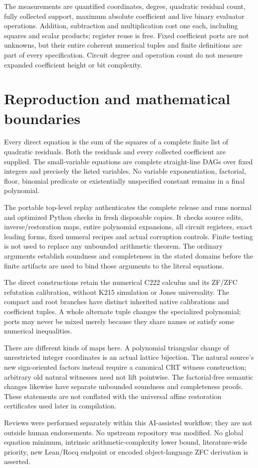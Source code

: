 \documentclass[11pt]{article}
\theoremstyle{definition}\newtheorem{definition}[theorem]{Definition}
\theoremstyle{remark}\newtheorem{remark}[theorem]{Remark}
\begin{document}
The measurements are quantified coordinates, degree, quadratic residual
count, fully collected support, maximum absolute coefficient and live
binary evaluator operations. Addition, subtraction and multiplication
cost one each, including squares and scalar products; register reuse is
free. Fixed coefficient ports are not unknowns, but their entire coherent
numerical tuples and finite definitions are part of every specification.
Circuit degree and operation count do not measure expanded coefficient
height or bit complexity.






\section{Reproduction and mathematical boundaries}
Every direct equation is the sum of the squares of a complete finite list
of quadratic residuals. Both the residuals and every collected coefficient
are supplied. The small-variable equations are complete straight-line
DAGs over fixed integers and precisely the listed variables. No variable
exponentiation, factorial, floor, binomial predicate or existentially
unspecified constant remains in a final polynomial.

The portable top-level replay authenticates the complete release and runs
normal and optimized Python checks in fresh disposable copies. It checks
source edits, inverse/restoration maps, entire polynomial expansions,
all circuit registers, exact leading forms, fixed numeral recipes and
actual corruption controls. Finite testing is not used to replace any
unbounded arithmetic theorem. The ordinary arguments establish soundness
and completeness in the stated domains before the finite artifacts are
used to bind those arguments to the literal equations.

The direct constructions retain the numerical C222 calculus and its
ZF/ZFC refutation calibration, without K215 simulation or Jones
universality. The compact and root branches have distinct inherited
native calibrations and coefficient tuples. A whole alternate tuple
changes the specialized polynomial; ports may never be mixed merely
because they share names or satisfy some numerical inequalities.

There are different kinds of maps here. A polynomial triangular change
of unrestricted integer coordinates is an actual lattice bijection.
The natural source's new sign-oriented factors instead require a
canonical CRT witness construction; arbitrary old natural witnesses
need not lift pointwise. The factorial-free semantic changes likewise
have separate unbounded soundness and completeness proofs. These
statements are not conflated with the universal affine restoration
certificates used later in compilation.

Reviews were performed separately within this AI-assisted workflow;
they are not outside human endorsements. No upstream repository was
modified. No global equation minimum, intrinsic arithmetic-complexity
lower bound, literature-wide priority, new Lean/Rocq endpoint or encoded
object-language ZFC derivation is asserted.
\appendix


\end{document}
